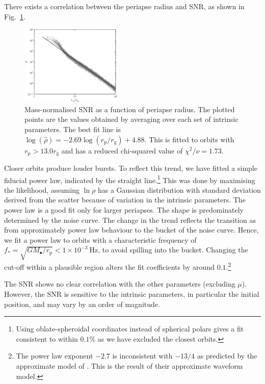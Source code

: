 \documentclass[useAMS,usedcolumn,usegraphicx,usenatbib]{mn2e}
\newcommand{\figref}[1]{Fig.~\ref{fig:#1}}
\newcommand{\units}[1]{\ensuremath{~\mathrm{#1}}}
\newcommand{\sub}[1]{\ensuremath{_\mathrm{#1}}}
\begin{document}
There exists a correlation between the periapse radius and SNR, as shown in \figref{SNR}.
\begin{figure}
  \begin{center}
  \includegraphics[width=0.43\textwidth]{Fig_SNR}
    \caption{Mass-normalised SNR as a function of periapse radius. The plotted points are the values obtained by averaging over each set of intrinsic parameters. The best fit line is $\log(\hat{\rho}) = -2.69\log(r\sub{p}/r\sub{g}) + 4.88$. This is fitted to orbits with $r\sub{p} >  13.0 r\sub{g}$ and has a reduced chi-squared value of $\chi^2/\nu = 1.73$.\label{fig:SNR}}
      \end{center}
\end{figure}
Closer orbits produce louder bursts. To reflect this trend, we have fitted a simple fiducial power law, indicated by the straight line.\footnote{Using oblate-spheroidal coordinates instead of spherical polars gives a fit consistent to within $0.1\%$ as we have excluded the closest orbits.} This was done by maximising the likelihood, assuming $\ln \rho$ has a Gaussian distribution with standard deviation derived from the scatter because of variation in the intrinsic parameters. The power law is a good fit only for larger periapses. The shape is predominately determined by the noise curve. The change in the trend reflects the transition as from approximately power law behaviour to the bucket of the noise curve. Hence, we fit a power law to orbits with a characteristic frequency of $f_\ast = \sqrt{GM_\bullet/r\sub{p}} < 1 \times 10^{-3}\units{Hz}$, to avoid spilling into the bucket. Changing the cut-off within a plausible region alters the fit coefficients by around $0.1$.\footnote{The power law exponent $-2.7$ is inconsistent with $-13/4$ as predicted by the approximate model of \citet{Hopman2007}. This is the result of their approximate waveform model.}

The SNR shows no clear correlation with the other parameters (excluding $\mu$). However, the SNR is sensitive to the intrinsic parameters, in particular the initial position, and may vary by an order of magnitude.
\end{document}
